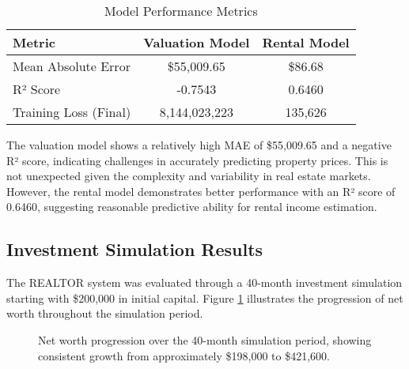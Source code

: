 \documentclass[conference]{IEEEtran}
\begin{document}
\begin{table}[htbp]
\caption{Model Performance Metrics}
\begin{center}
\begin{tabular}{lcc}
\hline
\textbf{Metric} & \textbf{Valuation Model} & \textbf{Rental Model} \\
\hline
Mean Absolute Error & \$55,009.65 & \$86.68 \\
R² Score & -0.7543 & 0.6460 \\
Training Loss (Final) & 8,144,023,223 & 135,626 \\
\hline
\end{tabular}
\label{tab:model_performance}
\end{center}
\end{table}

The valuation model shows a relatively high MAE of \$55,009.65 and a negative R² score, indicating challenges in accurately predicting property prices. This is not unexpected given the complexity and variability in real estate markets. However, the rental model demonstrates better performance with an R² score of 0.6460, suggesting reasonable predictive ability for rental income estimation.

\subsection{Investment Simulation Results}
The REALTOR system was evaluated through a 40-month investment simulation starting with \$200,000 in initial capital. Figure \ref{fig_net_worth} illustrates the progression of net worth throughout the simulation period.

\begin{figure}[htbp]
\caption{Net worth progression over the 40-month simulation period, showing consistent growth from approximately \$198,000 to \$421,600.}
\label{fig_net_worth}
\end{figure}
\end{document}
